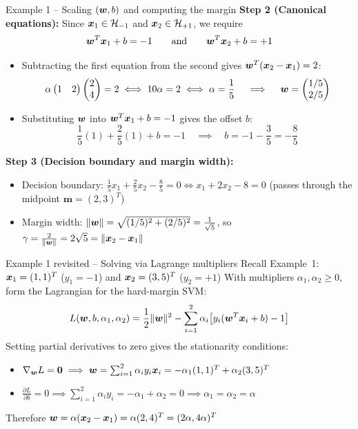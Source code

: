 \documentclass[aspectratio=169]{beamer}\usepackage[]{graphicx}\usepackage[]{xcolor}
\begin{document}
\begin{frame}{Example 1 -- Scaling $(\bm{w}, b)$ and computing the margin}
    \textbf{Step 2 (Canonical equations):} Since $\bm{x}_1 \in \mathcal{H}_{-1}$ and $\bm{x}_2 \in \mathcal{H}_{+1}$, we require
    \[
        \bm{w}^T \bm{x}_1 + b = -1 \qquad \text{and} \qquad \bm{w}^T \bm{x}_2 + b = +1
    \]
    \begin{itemize}
        \item Subtracting the first equation from the second gives $\bm{w}^T(\bm{x}_2 - \bm{x}_1) = 2$:
        \[
            \alpha \begin{pmatrix} 1 & 2 \end{pmatrix} \begin{pmatrix} 2 \\ 4 \end{pmatrix} = 2 \iff 10\alpha = 2 \iff \alpha = \frac{1}{5} \quad \implies \quad \bm{w} = \begin{pmatrix} 1/5 \\ 2/5 \end{pmatrix}
        \]
        \item Substituting $\bm{w}$ into $\bm{w}^T \bm{x}_1 + b = -1$ gives the offset $b$:
        \[
            \frac{1}{5}(1) + \frac{2}{5}(1) + b = -1 \quad \implies \quad b = -1 - \frac{3}{5} = -\frac{8}{5}
        \]
    \end{itemize}
    \vfill
    \textbf{Step 3 (Decision boundary and margin width):}
    \begin{itemize}
        \item Decision boundary: $\frac{1}{5}x_1 + \frac{2}{5}x_2 - \frac{8}{5} = 0 \iff x_1 + 2x_2 - 8 = 0$ (passes through the midpoint $\bm{m} = (2, 3)^T$)
        \item Margin width: $\|\bm{w}\| = \sqrt{(1/5)^2 + (2/5)^2} = \frac{1}{\sqrt{5}}$, so $\gamma = \frac{2}{\|\bm{w}\|} = 2\sqrt{5} = \|\bm{x}_2 - \bm{x}_1\|$
    \end{itemize}
\end{frame}


\begin{frame}{Example 1 revisited -- Solving via Lagrange multipliers}
    Recall Example~1: $\bm{x}_1 = (1, 1)^T$ ($y_1 = -1$) and $\bm{x}_2 = (3, 5)^T$ ($y_2 = +1$)
    \vfill
    With multipliers $\alpha_1, \alpha_2 \ge 0$, form the Lagrangian for the hard-margin SVM:
    \[
        L(\bm{w}, b, \alpha_1, \alpha_2) = \frac{1}{2}\|\bm{w}\|^2 - \sum_{i=1}^2 \alpha_i\bigl[y_i(\bm{w}^T \bm{x}_i + b) - 1\bigr]
    \]
    \vfill
    Setting partial derivatives to zero gives the stationarity conditions:
    \begin{itemize}
        \item $\nabla_{\bm{w}} L = \mathbf{0} \implies \bm{w} = \sum_{i=1}^2 \alpha_i y_i \bm{x}_i = -\alpha_1 (1, 1)^T + \alpha_2 (3, 5)^T$
        \item $\frac{\partial L}{\partial b} = 0 \implies \sum_{i=1}^2 \alpha_i y_i = -\alpha_1 + \alpha_2 = 0 \implies \alpha_1 = \alpha_2 = \alpha$
    \end{itemize}
    \vfill
    Therefore $\bm{w} = \alpha(\bm{x}_2 - \bm{x}_1) = \alpha (2, 4)^T = (2\alpha, 4\alpha)^T$
\end{frame}
\end{document}
